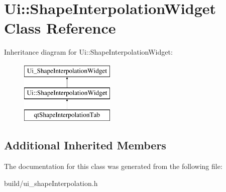 \hypertarget{class_ui_1_1_shape_interpolation_widget}{}\section{Ui\+:\+:Shape\+Interpolation\+Widget Class Reference}
\label{class_ui_1_1_shape_interpolation_widget}
Inheritance diagram for Ui\+:\+:Shape\+Interpolation\+Widget\+:\begin{figure}[H]
\begin{center}
\leavevmode
\includegraphics[height=3.000000cm]{class_ui_1_1_shape_interpolation_widget}
\end{center}
\end{figure}
\subsection*{Additional Inherited Members}


The documentation for this class was generated from the following file\+:\begin{DoxyCompactItemize}
\item 
build/ui\+\_\+shape\+Interpolation.\+h\end{DoxyCompactItemize}
